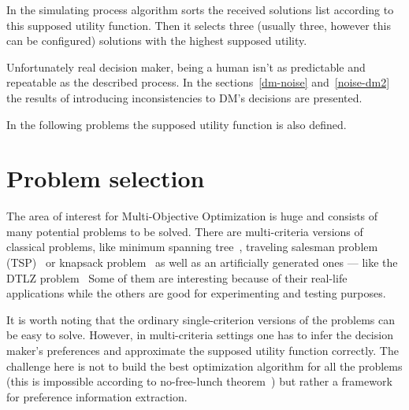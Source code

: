 In the simulating process algorithm sorts the received solutions list
according to this supposed utility function. Then it selects three (usually
three, however this can be configured) solutions with the highest supposed
utility.

Unfortunately real decision maker, being a human isn't as predictable and
repeatable as the described process. In the sections~\ref{dm-noise}
and~\ref{noise-dm2} the results of introducing inconsistencies to DM's
decisions are presented.

In the following problems the supposed utility function is also defined.

\section{Problem selection}

The area of interest for Multi-Objective Optimization is huge and consists of
many potential problems to be solved. There are multi-criteria versions of
classical problems, like minimum spanning tree~\cite{GH85}, traveling salesman
problem (TSP)~\cite{CRS+01} or knapsack problem~\cite{PGP10} as well as an
artificially generated ones --- like the DTLZ problem~\cite{DTL+02} Some of
them are interesting because of their real-life applications while the others
are good for experimenting and testing purposes.

It is worth noting that the ordinary single-criterion versions of the problems
can be easy to solve. However, in multi-criteria settings one has to infer the
decision maker's preferences and approximate the supposed utility function
correctly. The challenge here is not to build the best optimization algorithm
for all the problems (this is impossible according to no-free-lunch
theorem~\cite{WM97}) but rather a framework for preference information
extraction.

